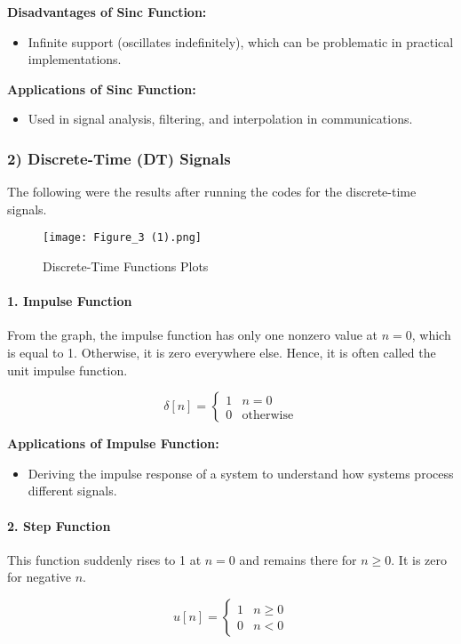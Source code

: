 \documentclass[12pt]{article}
\begin{document}
\textbf{Disadvantages of Sinc Function:}
\begin{itemize}
    \item Infinite support (oscillates indefinitely), which can be problematic in practical implementations.
\end{itemize}

\textbf{Applications of Sinc Function:}
\begin{itemize}
    \item Used in signal analysis, filtering, and interpolation in communications.
\end{itemize}

\subsubsection{2) Discrete-Time (DT) Signals}
The following were the results after running the codes for the discrete-time signals.
\begin{figure}[h]
    \centering
    \texttt{[image: Figure\_3 (1).png]}
    \caption{Discrete-Time Functions Plots}
    \label{fig DT}
\end{figure}

\paragraph{1. Impulse Function}
From the graph, the impulse function has only one nonzero value at \(n = 0\), which is equal to 1. Otherwise, it is zero everywhere else. Hence, it is often called the unit impulse function.

\[
\delta[n] = 
\begin{cases}
1 & n = 0 \\
0 & \text{otherwise}
\end{cases}
\]

\textbf{Applications of Impulse Function:}
\begin{itemize}
    \item Deriving the impulse response of a system to understand how systems process different signals.
\end{itemize}

\paragraph{2. Step Function}
This function suddenly rises to 1 at \(n = 0\) and remains there for \(n \ge 0\). It is zero for negative \(n\).

\[
u[n] = 
\begin{cases}
1 & n \ge 0 \\
0 & n < 0
\end{cases}
\]
\end{document}
